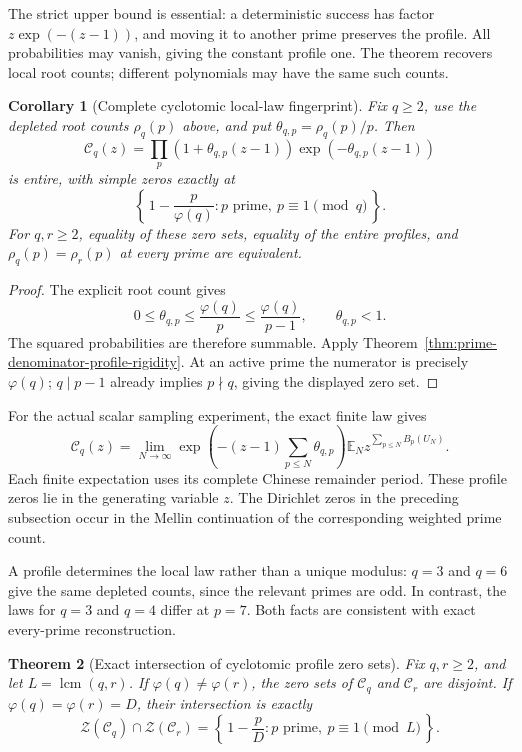 \documentclass[11pt]{article}
\newtheorem{theorem}{Theorem}[section]
\newtheorem{corollary}[theorem]{Corollary}
\theoremstyle{definition}
\begin{document}
The strict upper bound is essential: a deterministic success has factor
$z\exp(-(z-1))$, and moving it to another prime preserves the profile.
All probabilities may vanish, giving the constant profile one.
The theorem recovers local root counts; different polynomials may have
the same such counts.

\begin{corollary}[Complete cyclotomic local-law fingerprint]
\label{cor:cyclotomic-profile-fingerprint}
Fix $q\ge2$, use the depleted root counts $\rho_q(p)$ above, and put
$\theta_{q,p}=\rho_q(p)/p$. Then
\[
 \mathcal C_q(z)=
 \prod_p(1+\theta_{q,p}(z-1))
             \exp(-\theta_{q,p}(z-1))
\]
is entire, with simple zeros exactly at
\[
 \left\{\,1-\frac{p}{\varphi(q)}:
          p\text{ prime},\ p\equiv1\pmod q\,\right\}.
\]
For $q,r\ge2$, equality of these zero sets, equality of the entire
profiles, and $\rho_q(p)=\rho_r(p)$ at every prime are equivalent.
\end{corollary}

\begin{proof}
The explicit root count gives
\[
 0\le\theta_{q,p}\le\frac{\varphi(q)}p
       \le\frac{\varphi(q)}{p-1},\qquad \theta_{q,p}<1.
\]
The squared probabilities are therefore summable. Apply
Theorem~\ref{thm:prime-denominator-profile-rigidity}.
At an active prime the numerator is precisely $\varphi(q)$;
$q\mid p-1$ already implies $p\nmid q$, giving the displayed zero set.
\end{proof}

For the actual scalar sampling experiment, the exact finite law gives
\[
 \mathcal C_q(z)=\lim_{N\to\infty}
  \exp\!\left(-(z-1)\sum_{p\le N}\theta_{q,p}\right)
  \mathbb E_N z^{\sum_{p\le N}B_p(U_N)} .
\]
Each finite expectation uses its complete Chinese remainder period.
These profile zeros lie in the generating variable $z$. The Dirichlet
zeros in the preceding subsection occur in the Mellin continuation of
the corresponding weighted prime count.

A profile determines the local law rather than a unique modulus:
$q=3$ and $q=6$ give the same depleted counts, since the relevant primes
are odd. In contrast, the laws for $q=3$ and $q=4$ differ at $p=7$.
Both facts are consistent with exact every-prime reconstruction.

\begin{theorem}[Exact intersection of cyclotomic profile zero sets]
\label{thm:cyclotomic-profile-common-zeros}
Fix $q,r\ge2$, and let $L=\operatorname{lcm}(q,r)$.
If $\varphi(q)\ne\varphi(r)$, the zero sets of $\mathcal C_q$
and $\mathcal C_r$ are disjoint.
If $\varphi(q)=\varphi(r)=D$, their intersection is exactly
\[
 \mathcal Z(\mathcal C_q)\cap\mathcal Z(\mathcal C_r)
 =\left\{\,1-\frac pD:
                 p\text{ prime},\ p\equiv1\pmod L\,\right\}.
\]
\end{theorem}
\end{document}
